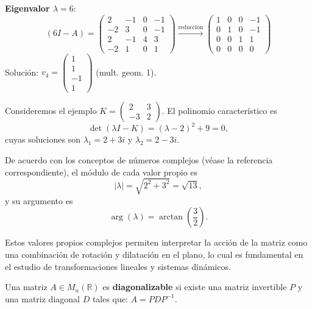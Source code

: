 \begin{prob}
\begin{enumerate}[$a)$]
\begin{myproof}
\textbf{Eigenvalor $\lambda=6$}:
\[
(6I - A) = \begin{pmatrix}
2 & -1 & 0 & -1 \\
-2 & 3 & 0 & -1 \\
2 & -1 & 4 & 3 \\
-2 & 1 & 0 & 1
\end{pmatrix} \xrightarrow{\text{reducción}} \begin{pmatrix}
1 & 0 & 0 & -1 \\
0 & 1 & 0 & -1 \\
0 & 0 & 1 & 1 \\
0 & 0 & 0 & 0
\end{pmatrix}
\]
Solución: $v_4 = \begin{pmatrix} 1 \\ 1 \\ -1 \\ 1 \end{pmatrix}$ (mult. geom. 1).
\end{myproof}
  \end{enumerate}  
\end{prob}


\begin{rem}
Consideremos el ejemplo $K = \begin{pmatrix} 2 & 3 \\ -3 & 2 \end{pmatrix}$. El polinomio característico es
\[
\det(\lambda I - K) = (\lambda - 2)^2 + 9 = 0,
\]
cuyas soluciones son $\lambda_1 = 2 + 3i$ y $\lambda_2 = 2 - 3i$.

De acuerdo con los conceptos de números complejos (véase la referencia correspondiente), el módulo de cada valor propio es
\[
|\lambda| = \sqrt{2^2 + 3^2} = \sqrt{13},
\]
y su argumento es
\[
\arg(\lambda) = \arctan\left(\frac{3}{2}\right).
\]

Estos valores propios complejos permiten interpretar la acción de la matriz como una combinación de rotación y dilatación en el plano, lo cual es fundamental en el estudio de transformaciones lineales y sistemas dinámicos.
\end{rem}




\begin{definition}
Una matriz $A \in M_n(\mathbb{R})$ es \textbf{diagonalizable} si existe una matriz invertible $P$ y una matriz diagonal $D$ tales que: \(A = PDP^{-1}.\)
\end{definition}


